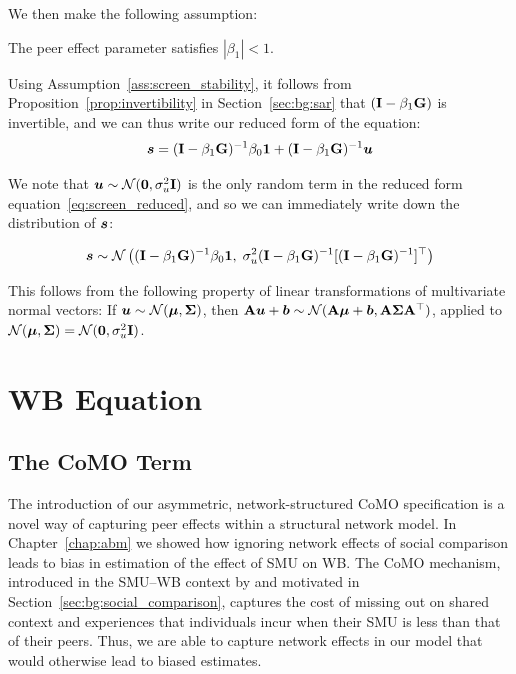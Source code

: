 We then make the following assumption:

\begin{assumption}
    \label{ass:screen_stability}
    The peer effect parameter satisfies $|\beta_1| < 1$.
\end{assumption}

Using Assumption~\ref{ass:screen_stability}, it follows from Proposition~\ref{prop:invertibility} in Section~\ref{sec:bg:sar} that $(\mathbf{I} - \beta_1\mathbf{G})$ is invertible, and we can thus write our reduced form of the equation:
\begin{equation}
\label{eq:screen_reduced}
    \bm{s} = (\mathbf{I} - \beta_1\mathbf{G})^{-1}\beta_0\bm{1}
             + (\mathbf{I} - \beta_1\mathbf{G})^{-1}\bm{u}
\end{equation}

We note that $\bm{u} \sim \mathcal{N}(\bm{0}, \sigma_u^2\mathbf{I})$ is the only random term in the reduced form equation~\eqref{eq:screen_reduced}, and so we can immediately write down the distribution of $\bm{s}$:

\begin{equation}
    \label{eq:s_distribution}
    \bm{s} \sim \mathcal{N}\left((\mathbf{I} - \beta_1\mathbf{G})^{-1}\beta_0\bm{1}, \;
    \sigma_u^2(\mathbf{I} - \beta_1\mathbf{G})^{-1}
    [(\mathbf{I} - \beta_1\mathbf{G})^{-1}]^\top\right)
\end{equation}

This follows from the following property of linear transformations of multivariate normal vectors: If $\bm{u} \sim \mathcal{N}(\bm{\mu}, \mathbf{\Sigma})$, then $\mathbf{A}\bm{u} + \bm{b} \sim \mathcal{N}(\mathbf{A}\bm{\mu} + \bm{b}, \mathbf{A}\mathbf{\Sigma}\mathbf{A}^\top)$, applied to $\mathcal{N}(\bm{\mu}, \mathbf{\Sigma}) = \mathcal{N}(\bm{0}, \sigma_u^2\mathbf{I})$.

\section{WB Equation}
\label{sec:model:wellbeing}
\subsection{The CoMO Term}
\label{sec:model:como}
The introduction of our asymmetric, network-structured CoMO specification is a novel way of capturing peer effects within a structural network model. In Chapter~\ref{chap:abm} we showed how ignoring network effects of social comparison leads to bias in estimation of the effect of SMU on WB\@. The CoMO mechanism, introduced in the SMU--WB context by \textcite[Eqs.~1--2]{DahlFoldnesGronneberg2024} and motivated in Section~\ref{sec:bg:social_comparison}, captures the cost of missing out on shared context and experiences that individuals incur when their SMU is less than that of their peers. Thus, we are able to capture network effects in our model that would otherwise lead to biased estimates.

